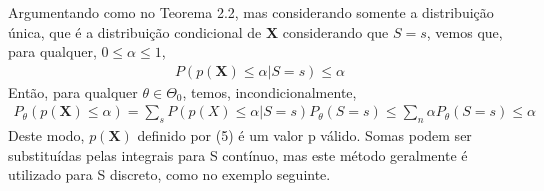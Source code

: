 \documentclass[10pt]{article}
\theoremstyle{plain}
\theoremstyle{remark}
\theoremstyle{definition}
\begin{document}
Argumentando como no Teorema 2.2, mas considerando somente a distribuição única, que é a distribuição condicional de \textbf{X} considerando que $S=s$, vemos que, para qualquer, $0 \leq \alpha \leq 1$, 
\begin{align*}
    P(p(\textbf{X}) \leq \alpha| S=s) \leq \alpha
\end{align*}
Então, para qualquer $\theta \in \Theta_{0}$, temos, incondicionalmente,
\begin{align*}
    P_{\theta}(p(\textbf{X})\leq \alpha)=\sum_{s}P(p(X)\leq\alpha|S=s)P_{\theta}(S=s) \leq \sum_{n}\alpha P_{\theta}(S=s) \leq \alpha
\end{align*}
Deste modo, $p(\textbf{X})$ definido por (5) é um valor p válido. Somas podem ser substituídas pelas integrais para S contínuo, mas este método geralmente é utilizado para S discreto, como no exemplo seguinte. 
\end{document}
